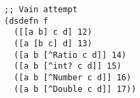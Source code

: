 \begin{lstlisting}[style=reclojureClojure,frame=single]
;; Vain attempt
(dsdefn f 
  ([[a b] c d] 12)
  ([a [b c] d] 13)
  ([a b [^Ratio c d]] 14)
  ([a b [^int? c d]] 15)
  ([a b [^Number c d]] 16)
  ([a b [^Double c d]] 17))
\end{lstlisting}

